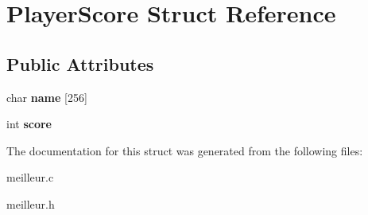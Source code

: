 \hypertarget{structPlayerScore}{}\section{Player\+Score Struct Reference}
\label{structPlayerScore}
\subsection*{Public Attributes}
\begin{DoxyCompactItemize}
\item 
\mbox{\label{structPlayerScore_af8a049451b4b160d55b9494faa1156d2}} 
char {\bfseries name} \mbox{[}256\mbox{]}
\item 
\mbox{\label{structPlayerScore_ace29a1b82acd6d4fdcc6398c93131141}} 
int {\bfseries score}
\end{DoxyCompactItemize}


The documentation for this struct was generated from the following files\+:\begin{DoxyCompactItemize}
\item 
meilleur.\+c\item 
meilleur.\+h\end{DoxyCompactItemize}
